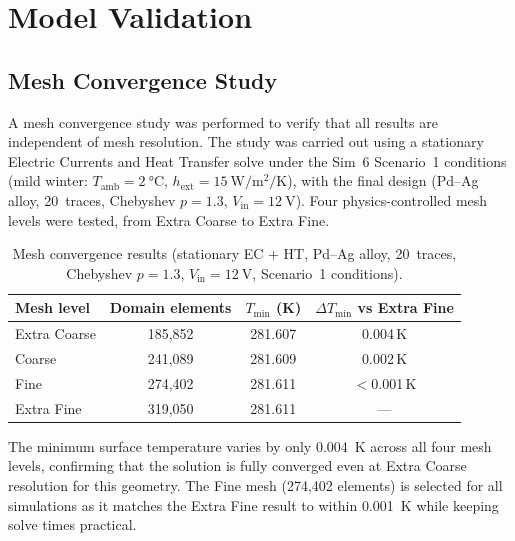 \chapter{Model Validation}
\label{ch:validation}


\section{Mesh Convergence Study}
\label{sec:mesh-convergence}

A mesh convergence study was performed to verify that all results are independent of mesh resolution. The study was carried out using a stationary Electric Currents and Heat Transfer solve under the Sim~6 Scenario~1 conditions (mild winter: $T_\text{amb} = \SI{2}{\celsius}$, $h_\text{ext} = \SI{15}{\watt\per\metre\squared\per\kelvin}$), with the final design (Pd--Ag alloy, 20~traces, Chebyshev $p = 1.3$, $V_\text{in} = \SI{12}{\volt}$). Four physics-controlled mesh levels were tested, from Extra Coarse to Extra Fine.

\begin{table}[H]
    \centering
    \caption{Mesh convergence results (stationary EC + HT, Pd--Ag alloy, 20~traces, Chebyshev $p = 1.3$, $V_\text{in} = \SI{12}{\volt}$, Scenario~1 conditions).}
    \label{tab:mesh-convergence}
    \begin{tabular}{@{}lccc@{}}
        \toprule
        \textbf{Mesh level} & \textbf{Domain elements} & $T_\text{min}$ \textbf{(K)} & $\Delta T_\text{min}$ \textbf{vs Extra Fine} \\
        \midrule
        Extra Coarse & 185,852  & 281.607 & 0.004\,K \\
        Coarse       & 241,089  & 281.609 & 0.002\,K \\
        Fine         & 274,402  & 281.611 & $<$0.001\,K \\
        Extra Fine   & 319,050  & 281.611 & --- \\
        \bottomrule
    \end{tabular}
\end{table}

The minimum surface temperature varies by only \SI{0.004}{\kelvin} across all four mesh levels, confirming that the solution is fully converged even at Extra Coarse resolution for this geometry. The Fine mesh (274,402 elements) is selected for all simulations as it matches the Extra Fine result to within \SI{0.001}{\kelvin} while keeping solve times practical.

